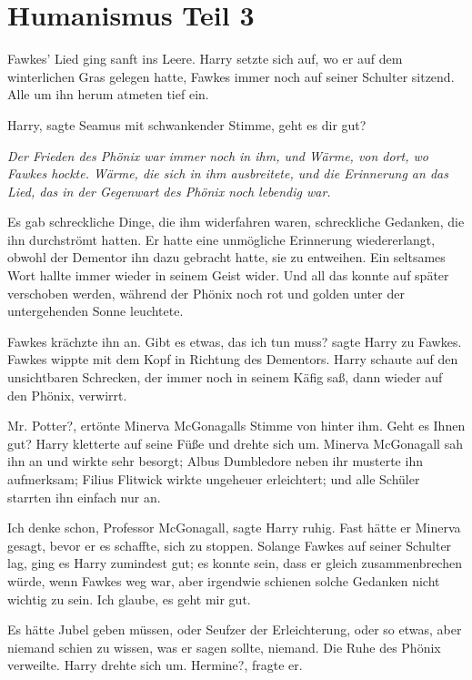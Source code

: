 \chapter{Humanismus Teil 3}

Fawkes' Lied ging sanft ins Leere. Harry setzte sich auf, wo er auf dem
winterlichen Gras gelegen hatte, Fawkes immer noch auf seiner Schulter sitzend.
Alle um ihn herum atmeten tief ein.

\glqq{}Harry\grqq{}, sagte Seamus mit schwankender Stimme, \glqq{}geht es dir
gut?\grqq{}

\emph{Der Frieden des Phönix war immer noch in ihm, und Wärme, von dort, wo
Fawkes hockte. Wärme, die sich in ihm ausbreitete, und die Erinnerung an das
Lied, das in der Gegenwart des Phönix noch lebendig war.}

Es gab schreckliche Dinge, die ihm widerfahren waren, schreckliche Gedanken, die
ihn durchströmt hatten. Er hatte eine unmögliche Erinnerung wiedererlangt,
obwohl der Dementor ihn dazu gebracht hatte, sie zu entweihen. Ein seltsames
Wort hallte immer wieder in seinem Geist wider. Und all das konnte auf später
verschoben werden, während der Phönix noch rot und golden unter der
untergehenden Sonne leuchtete.

Fawkes krächzte ihn an. \glqq{}Gibt es etwas, das ich tun muss?\grqq{} sagte
Harry zu Fawkes. Fawkes wippte mit dem Kopf in Richtung des Dementors. Harry
schaute auf den unsichtbaren Schrecken, der immer noch in seinem Käfig saß, dann
wieder auf den Phönix, verwirrt.

\glqq{}Mr. Potter?\grqq{}, ertönte Minerva McGonagalls Stimme von hinter ihm.
\glqq{}Geht es Ihnen gut?\grqq{} Harry kletterte auf seine Füße und drehte sich um.
Minerva McGonagall sah ihn an und wirkte sehr besorgt; Albus Dumbledore neben
ihr musterte ihn aufmerksam; Filius Flitwick wirkte ungeheuer erleichtert; und
alle Schüler starrten ihn einfach nur an.

\glqq{}Ich denke schon, Professor McGonagall\grqq{}, sagte Harry ruhig. Fast
hätte er Minerva gesagt, bevor er es schaffte, sich zu stoppen. Solange Fawkes
auf seiner Schulter lag, ging es Harry zumindest gut; es konnte sein, dass er
gleich zusammenbrechen würde, wenn Fawkes weg war, aber irgendwie schienen
solche Gedanken nicht wichtig zu sein. \glqq{}Ich glaube, es geht mir gut.\grqq{}

Es hätte Jubel geben müssen, oder Seufzer der Erleichterung, oder so etwas, aber
niemand schien zu wissen, was er sagen sollte, niemand. Die Ruhe des Phönix
verweilte. Harry drehte sich um. \glqq{}Hermine?\grqq{}, fragte er.

